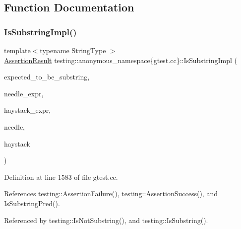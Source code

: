 \subsection{Function Documentation}
\mbox{\label{namespacetesting_1_1anonymous__namespace_02gtest_8cc_03_a0e1cb1e2b03a87a9c893322e4caab670}} 
\subsubsection{\texorpdfstring{Is\+Substring\+Impl()}{IsSubstringImpl()}}
{\footnotesize\ttfamily template$<$typename String\+Type $>$ \\
\hyperlink{classtesting_1_1AssertionResult}{Assertion\+Result} testing\+::anonymous\+\_\+namespace\{gtest.\+cc\}\+::Is\+Substring\+Impl (\begin{DoxyParamCaption}\item[{\hyperlink{classbool}{bool}}]{expected\+\_\+to\+\_\+be\+\_\+substring,  }\item[{const char $\ast$}]{needle\+\_\+expr,  }\item[{const char $\ast$}]{haystack\+\_\+expr,  }\item[{const String\+Type \&}]{needle,  }\item[{const String\+Type \&}]{haystack }\end{DoxyParamCaption})}



Definition at line 1583 of file gtest.\+cc.



References testing\+::\+Assertion\+Failure(), testing\+::\+Assertion\+Success(), and Is\+Substring\+Pred().



Referenced by testing\+::\+Is\+Not\+Substring(), and testing\+::\+Is\+Substring().


